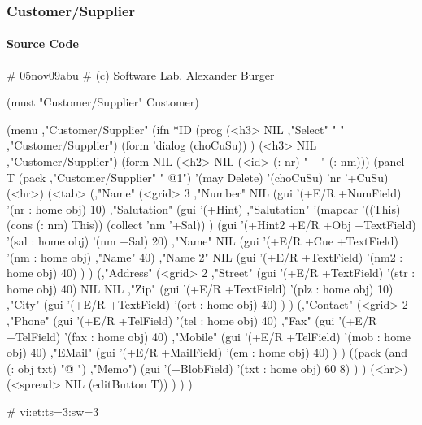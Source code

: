 \subsubsection{ Customer/Supplier}
\label{sec:appl-devel-customer/supplier}%

\paragraph{Source Code}
\label{sec:appl-devel-customer/supplier-source-code}

\begin{wideverbatim}

# 05nov09abu
# (c) Software Lab. Alexander Burger

(must "Customer/Supplier" Customer)

(menu ,"Customer/Supplier"
   (ifn *ID
      (prog
         (<h3> NIL ,"Select" " " ,"Customer/Supplier")
         (form 'dialog (choCuSu)) )
      (<h3> NIL ,"Customer/Supplier")
      (form NIL
         (<h2> NIL (<id> (: nr) " -- " (: nm)))
         (panel T (pack ,"Customer/Supplier" " @1") '(may Delete) '(choCuSu) 'nr '+CuSu)
         (<hr>)
         (<tab>
            (,"Name"
               (<grid> 3
                  ,"Number" NIL (gui '(+E/R +NumField) '(nr : home obj) 10)
                  ,"Salutation"
                  (gui '(+Hint) ,"Salutation"
                     '(mapcar '((This) (cons (: nm) This)) (collect 'nm '+Sal)) )
                  (gui '(+Hint2 +E/R +Obj +TextField) '(sal : home obj) '(nm +Sal) 20)
                  ,"Name" NIL (gui '(+E/R +Cue +TextField) '(nm : home obj) ,"Name" 40)
                  ,"Name 2" NIL (gui '(+E/R +TextField) '(nm2 : home obj) 40) ) )
            (,"Address"
               (<grid> 2
                  ,"Street" (gui '(+E/R +TextField) '(str : home obj) 40)
                  NIL NIL
                  ,"Zip" (gui '(+E/R +TextField) '(plz : home obj) 10)
                  ,"City" (gui '(+E/R +TextField) '(ort : home obj) 40) ) )
            (,"Contact"
               (<grid> 2
                  ,"Phone" (gui '(+E/R +TelField) '(tel : home obj) 40)
                  ,"Fax" (gui '(+E/R +TelField) '(fax : home obj) 40)
                  ,"Mobile" (gui '(+E/R +TelField) '(mob : home obj) 40)
                  ,"EMail" (gui '(+E/R +MailField) '(em : home obj) 40) ) )
            ((pack (and (: obj txt) "@ ") ,"Memo")
               (gui '(+BlobField) '(txt : home obj) 60 8) ) )
         (<hr>)
         (<spread> NIL (editButton T)) ) ) )

# vi:et:ts=3:sw=3

\end{wideverbatim}


